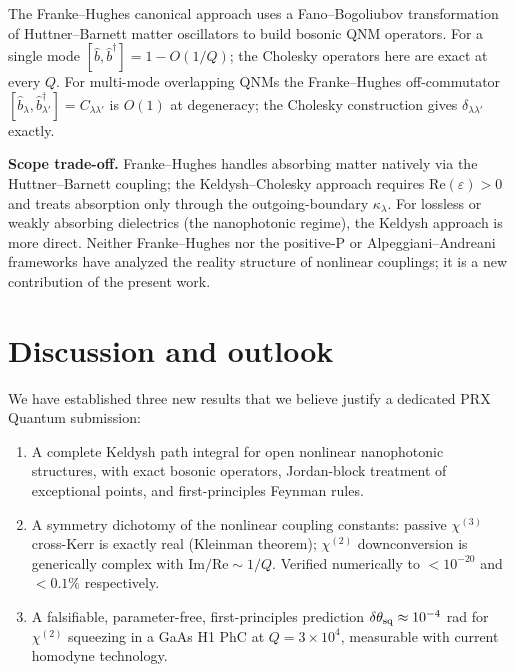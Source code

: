 \documentclass[11pt]{article}
\begin{document}
The Franke--Hughes canonical approach \cite{Franke2019,Ren2021,Franke2020}
uses a Fano--Bogoliubov transformation of Huttner--Barnett
matter oscillators to build bosonic QNM operators.  For a single mode
$[\hat b,\hat b^\dagger]=1-O(1/Q)$; the Cholesky operators here are
exact at every $Q$.  For multi-mode overlapping QNMs the
Franke--Hughes off-commutator $[\hat b_\lambda,\hat b_{\lambda'}^\dagger]
=C_{\lambda\lambda'}$ is $O(1)$ at degeneracy; the Cholesky construction
gives $\delta_{\lambda\lambda'}$ exactly.

\textbf{Scope trade-off.}  Franke--Hughes handles absorbing matter
natively via the Huttner--Barnett coupling; the Keldysh--Cholesky
approach requires
$\mathrm{Re}(\varepsilon)>0$ and treats absorption only through the
outgoing-boundary $\kappa_\lambda$.  For lossless or weakly absorbing
dielectrics (the nanophotonic regime), the Keldysh approach is more
direct.  Neither Franke--Hughes nor the positive-P
\cite{Drummond1980,DrummondHillery2014} or Alpeggiani--Andreani
\cite{Alpeggiani2015,Alpeggiani2017} frameworks have analyzed the
reality structure of nonlinear couplings; it is a new contribution
of the present work.

\section{Discussion and outlook}
\label{sec:discussion}

We have established three new results that we believe justify a
dedicated PRX Quantum submission:
\begin{enumerate}\itemsep0em
\item A complete Keldysh path integral for open nonlinear nanophotonic
  structures, with exact bosonic operators, Jordan-block treatment of
  exceptional points, and first-principles Feynman rules.
\item A symmetry dichotomy of the nonlinear coupling constants:
  passive $\chi^{(3)}$ cross-Kerr is exactly real (Kleinman theorem);
  $\chi^{(2)}$ downconversion is generically complex with
  $\mathrm{Im}/\mathrm{Re}\sim 1/Q$.  Verified numerically to
  $<10^{-20}$ and $<0.1\%$ respectively.
\item A falsifiable, parameter-free, first-principles prediction
  $\delta\theta_{\rm sq}\approx 10^{-4}$ rad for $\chi^{(2)}$
  squeezing in a GaAs H1 PhC at $Q=3\times 10^4$, measurable with
  current homodyne technology.
\end{enumerate}
\end{document}
